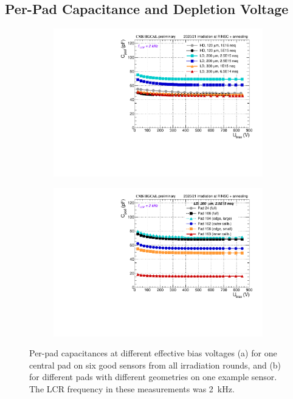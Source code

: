 \subsection{Per-Pad Capacitance and Depletion Voltage}
\label{subsec:QA_Vdep}

\begin{figure}
	\captionsetup[subfigure]{aboveskip=-1pt,belowskip=-1pt}
	\centering
	\begin{subfigure}[b]{0.49\textwidth}
		\includegraphics[width=0.999\textwidth]{plots/channel_cv/channel_CV_sensors_sensors.pdf}
		\subcaption{
		}
		\label{plot:pad_CV_sensor}
	\end{subfigure}
	\hfill
	\begin{subfigure}[b]{0.49\textwidth}
		\includegraphics[width=0.999\textwidth]{plots/channel_cv/channel_CV_sensors_channels.pdf}
		\subcaption{
		}
		\label{plot:pad_CV_channels}
	\end{subfigure}
	\caption{
		Per-pad capacitances at different effective bias voltages (a) for one central pad on six good sensors from all irradiation rounds, and (b) for different pads with different geometries on one example sensor.
		The LCR frequency in these measurements was \SI{2}{\kilo\hertz}.
	}
\end{figure}


